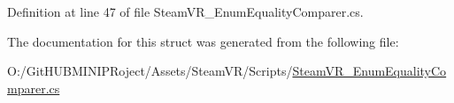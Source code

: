 Definition at line 47 of file Steam\+V\+R\+\_\+\+Enum\+Equality\+Comparer.\+cs.



The documentation for this struct was generated from the following file\+:\begin{DoxyCompactItemize}
\item 
O\+:/\+Git\+H\+U\+B\+M\+I\+N\+I\+P\+Roject/\+Assets/\+Steam\+V\+R/\+Scripts/\mbox{\hyperlink{_steam_v_r___enum_equality_comparer_8cs}{Steam\+V\+R\+\_\+\+Enum\+Equality\+Comparer.\+cs}}\end{DoxyCompactItemize}
